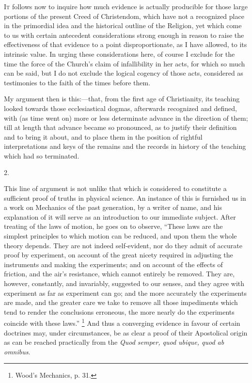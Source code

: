 
I\textsc{t} follows now to inquire how much evidence is
actually producible for those large portions of the
present Creed of Christendom, which have not a recognized
place in the primordial idea and the historical outline
of the Religion, yet which come to us with certain
antecedent considerations strong enough in reason to
raise the effectiveness of that evidence to a point
disproportionate, as I have allowed, to its intrinsic
value. In urging these considerations here, of course I
exclude for the time the force of the Church's claim of
infallibility in her acts, for which so much can be said,
but I do not exclude the logical cogency of those acts,
considered as testimonies to the faith of the times
before them.

My argument then is this:—that, from the first
age of Christianity, its teaching looked towards those
ecclesiastical dogmas, afterwards recognized and defined,
with (as time went on) more or less determinate advance
in the direction of them; till at length that advance
became so pronounced, as to justify their definition and
to bring it about, and to place them in the position of
rightful interpretations and keys of the remains and the
records in history of the teaching which had so
terminated.

2.

This line of argument is not unlike that which is
considered to constitute a sufficient proof of truths in physical science. An instance of this is furnished us in
a work on Mechanics of the past generation, by a writer
of name, and his explanation of it will serve as an
introduction to our immediate subject. After treating of
the laws of motion, he goes on to observe, ``These
laws are the simplest principles to which motion can be
reduced, and upon them the whole theory depends. They are
not indeed self-evident, nor do they admit of accurate
proof by experiment, on account of the great nicety
required in adjusting the instruments and making the
experiments; and on account of the effects of friction,
and the air's resistance, which cannot entirely be
removed. They are, however, constantly, and invariably,
suggested to our senses, and they agree with experiment
as far as experiment can go; and the more accurately the
experiments are made, and the greater care we take to
remove all those impediments which tend to render the
conclusions erroneous, the more nearly do the experiments
coincide with these laws.'' \footnote{Wood's Mechanics, p. 31.} And thus a converging evidence
in favour of certain doctrines may, under circumstances,
be as clear a proof of their Apostolical origin as can be
reached practically from the \emph{Quod semper, quod ubique,
quod ab omnibus}.

